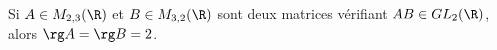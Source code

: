 Si $A\in M_{2,3}(\R)$ et $B \in M_{3,2}(\R)$ sont deux matrices vérifiant $AB \in GL_2(\R)$, alors $\rg A = \rg B = 2$.

\begin{reponses}
\end{reponses}

